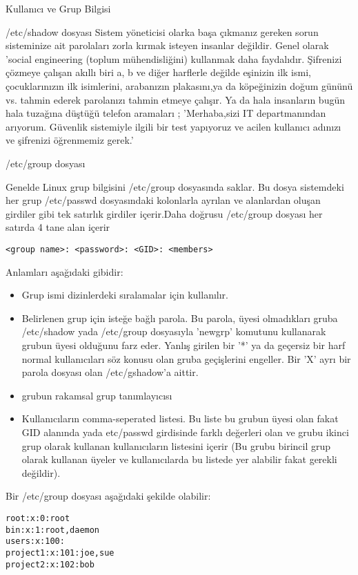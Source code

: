 \begin{section}{Kullanıcı ve Grup Bilgisi}
\begin{subsection}{/etc/shadow dosyası}
Sistem yöneticisi olarka başa çıkmanız gereken sorun sisteminize ait parolaları zorla kırmak isteyen insanlar değildir. Genel olarak 'social engineering (toplum mühendisliğini) kullanmak daha faydalıdır. Şifrenizi çözmeye çalışan akıllı biri a, b ve diğer harflerle değilde eşinizin ilk ismi, çocuklarınızın ilk isimlerini, arabanızın plakasını,ya da köpeğinizin doğum gününü vs. tahmin ederek parolanızı tahmin etmeye çalışır. Ya da hala insanların bugün hala tuzağına düştüğü telefon aramaları ; 'Merhaba,sizi IT departmanından arıyorum. Güvenlik sistemiyle ilgili bir test yapıyoruz ve acilen kullanıcı adınızı ve şifrenizi öğrenmemiz gerek.'
\end{subsection}
\begin{subsection}{/etc/group dosyası}

Genelde Linux grup bilgisini /etc/group dosyasında saklar. Bu dosya sistemdeki her grup /etc/passwd dosyasındaki kolonlarla ayrılan ve alanlardan oluşan girdiler gibi tek satırlık girdiler içerir.Daha doğrusu /etc/group dosyası her satırda 4 tane alan içerir
\begin{verbatim}
<group name>: <password>: <GID>: <members>
\end{verbatim}

Anlamları aşağıdaki gibidir:

\begin{itemize}
\item[group name]Grup ismi dizinlerdeki sıralamalar için kullanılır.
\item[password]Belirlenen grup için isteğe bağlı parola. Bu parola, üyesi olmadıkları gruba /etc/shadow yada /etc/group dosyasıyla 'newgrp' komutunu kullanarak grubun üyesi olduğunu farz eder. Yanlış girilen bir '*' ya da geçersiz bir harf normal kullanıcıları söz konusu olan gruba geçişlerini engeller. Bir 'X' ayrı bir parola dosyası olan /etc/gshadow'a aittir.
\item[GID]grubun rakamsal grup tanımlayıcısı
\item[members]Kullanıcıların comma-seperated listesi. Bu liste bu grubun üyesi olan fakat GID alanında yada etc/passwd girdisinde farklı değerleri olan ve grubu ikinci grup olarak kullanan kullanıcıların listesini içerir (Bu grubu birincil grup olarak kullanan üyeler ve kullanıcılarda bu listede yer alabilir fakat gerekli değildir).
\end{itemize}

Bir /etc/group dosyası aşağıdaki şekilde olabilir:
\begin{verbatim}
root:x:0:root
bin:x:1:root,daemon
users:x:100:
project1:x:101:joe,sue
project2:x:102:bob
\end{verbatim}


\end{subsection}
\end{section}
